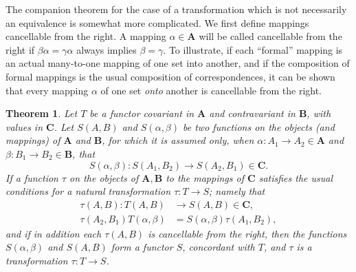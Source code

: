 \documentclass[11pt,a4paper]{report}
\newtheorem{theorem}{Theorem}
\begin{document}
The companion theorem for the case of a transformation which is not necessarily an equivalence is somewhat more
complicated. We first define mappings cancellable from the right. A mapping $\alpha\in\mathbf{A}$ will be
called cancellable from the right if $\beta\alpha=\gamma\alpha$ always implies $\beta=\gamma$. To illustrate,
if each ``formal'' mapping is an actual many\hyp{}to\hyp{}one mapping of one set into another, and if the 
composition of formal mappings is the usual composition of correspondences, it can be shown that every mapping
$\alpha$ of one set \emph{onto} another is cancellable from the right.
\begin{theorem}\label{thm:func_comp}
	Let $T$ be a functor covariant in $\mathbf{A}$ and contravariant in $\mathbf{B}$, with values in
	$\mathbf{C}$. Let $S(A,B)$ and $S(\alpha,\beta)$ be two functions on the objects (and mappings) of
	$\mathbf{A}$ and $\mathbf{B}$, for which it is assumed only, when $\alpha:A_1\rightarrow A_2
	\in\mathbf{A}$ and $\beta:B_1\rightarrow B_2\in\mathbf{B}$, that
	\begin{equation*}
		S(\alpha,\beta):S(A_1,B_2)\rightarrow S(A_2,B_1)\in\mathbf{C}.
	\end{equation*}
	If a function $\tau$ on the objects of $\mathbf{A,B}$ to the mappings of $\mathbf{C}$ satisfies the
	usual conditions for a natural transformation $\tau:T\rightarrow S$; namely that
	\begin{align}
		\tau(A,B):T(A,B)&\rightarrow S(A,B)\in\mathbf{C},\label{eq:functor_comp1}\\
		\tau(A_2,B_1)T(\alpha,\beta)&=S(\alpha,\beta)\tau(A_1,B_2),\label{eq:functor_comp2}
	\end{align}
	and if in addition each $\tau(A,B)$ is cancellable from the right, then the functions $S(\alpha,\beta)$
	and $S(A,B)$ form a functor $S$, concordant with $T$, and $\tau$ is a transformation $\tau:T\rightarrow S$.
\end{theorem}
\end{document}
